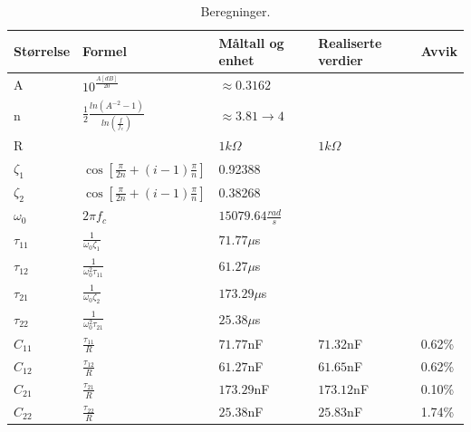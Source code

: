 \begin{table}[hbt]
    \caption{Beregninger.}
    \centering
    \begin{tabular}{lllll}
        \hline
        Størrelse   & Formel                                              & Måltall og enhet          & Realiserte verdier  & Avvik\\ \hline
        A           & $10^{\frac{A[dB]}{20}}$                             & $\approx0.3162$           &                     & \\ 
        n           & $\frac{1}{2}\frac{ln(A^{-2}-1)}{ln(\frac{f}{f_c})}$ & $\approx3.81\rightarrow4$ &                     & \\ 
        R           &                                                     & $1k\Omega$                & $1k\Omega$          & \\ 
        $\zeta_1$   & $\cos [\frac{\pi}{2n}+(i-1)\frac{\pi}{n}]$          & 0.92388                   &                     & \\ 
        $\zeta_2$   & $\cos [\frac{\pi}{2n}+(i-1)\frac{\pi}{n}]$          & 0.38268                   &                     & \\ 
        $\omega_0$  & $2\pi f_c$                                          & $15079.64\frac{rad}{s}$   &                     & \\ 
        $\tau_{11}$ & $\frac{1}{\omega_0 \zeta_1}$                        & $71.77\mu $s              &                     & \\ 
        $\tau_{12}$ & $\frac{1}{\omega_0^2 \tau_{11}}$                    & $61.27\mu $s              &                     & \\ 
        $\tau_{21}$ & $\frac{1}{\omega_0 \zeta_2}$                        & $173.29\mu $s             &                     & \\ 
        $\tau_{22}$ & $\frac{1}{\omega_0^2 \tau_{21}}$                    & $25.38\mu $s              &                     & \\ 
        $C_{11}$    & $\frac{\tau_{11}}{R}$                               & $71.77$nF                 &$71.32$nF            & 0.62\%\\ 
        $C_{12}$    & $\frac{\tau_{12}}{R}$                               & $61.27$nF                 &$61.65$nF            & 0.62\%\\ 
        $C_{21}$    & $\frac{\tau_{21}}{R}$                               & $173.29$nF                &$173.12$nF           & 0.10\%\\ 
        $C_{22}$    & $\frac{\tau_{22}}{R}$                               & $25.38$nF                 &$25.83$nF            & 1.74\%\\ 
        \end{tabular}
        \label{tab:calculations}
    \end{table}


